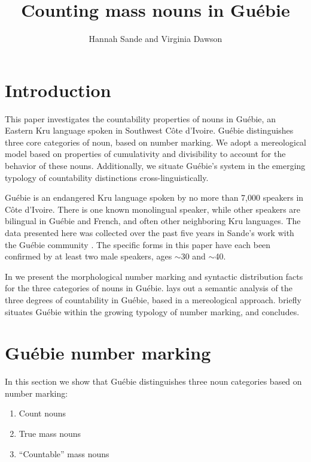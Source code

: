 \documentclass[output=paper,colorlinks,citecolor=brown]{langscibook}
\title{Counting mass nouns in Guébie}
\author{Hannah Sande\affiliation{Georgetown University} and Virginia Dawson\affiliation{University of California, Berkeley}}
\begin{document}
\maketitle 

\section{Introduction}\label{sec:sande:1}

This paper investigates the countability properties of nouns in Guébie, an Eastern Kru language spoken in Southwest Côte d'Ivoire. Guébie distinguishes three core categories of noun, based on number marking. We adopt a mereological model based on properties of cumulativity and divisibility to account for the behavior of these nouns. Additionally, we situate Guébie's system in the emerging typology of countability distinctions cross-linguistically.

Guébie is an endangered Kru language spoken by no more than 7,000 speakers in Côte d'Ivoire. There is one known monolingual speaker, while other speakers are bilingual in Guébie and French, and often other neighboring Kru languages. The data presented here was collected over the past five years in Sande's work with the Guébie community \citep{Sande2017}. The specific forms in this paper have each been confirmed by at least two male speakers, ages $\sim$30 and $\sim$40.

In  we present the morphological number marking and syntactic distribution facts for the three categories of nouns in Guébie.  lays out a semantic analysis of the three degrees of countability in Guébie, based in a mereological approach.  briefly situates Guébie within the growing typology of number marking, and  concludes.

\section{Guébie number marking}\label{sec:sande:2}

In this section we show that Guébie distinguishes three noun categories based on number marking:

\begin{enumerate}
	\item Count nouns
	\item True mass nouns
	\item ``Countable'' mass nouns
\end{enumerate}
\end{document}
